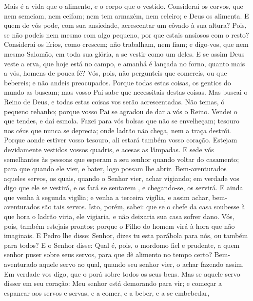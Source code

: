 {  Mais é a vida que o alimento, e
{} o corpo que o vestido.
  Considerai os corvos, que nem semeiam, nem ceifam; nem tem armazém, nem celeiro; e Deus os alimenta.
  E quem de vós pode, com sua ansiedade, acrescentar um côvado à sua altura?
  Pois, se não podeis nem mesmo com algo pequeno, por que estais ansiosos com o resto?
  Considerai os lírios, como crescem; não trabalham, nem fiam; e digo-vos, que nem mesmo Salomão, em toda sua glória,
{} a se vestir como um deles.
  E se assim Deus veste a erva, que hoje está no campo, e amanhá é lançada no forno, quanto mais
{} a vós, homens de pouca fé?
  Vós, pois, não pergunteis que comereis, ou que bebereis; e não andeis preocupados.
  Porque todas estas coisas, os gentios do mundo as buscam; mas vosso Pai sabe que necessitais destas coisas.
  Mas buscai o Reino de Deus, e todas estas coisas vos serão acrescentadas.
  Não temas, ó pequeno rebanho; porque vosso Pai se agradou de dar a vós o Reino.
  Vendei o que tendes, e daí esmola. Fazei para vós bolsas que não se envelheçam; tesouro nos céus que nunca se deprecia; onde ladrão não chega, nem a traça destrói.
  Porque aonde estiver vosso tesouro, ali estará também vosso coração.
  Estejam devidamente vestidos vossos quadris, e acesas as lâmpadas.
  E sede vós semelhantes às pessoas que esperam a seu senhor quando voltar do casamento; para que quando ele vier, e bater, logo possam lhe abrir.
  Bem-aventurados aqueles servos, os quais, quando o Senhor vier,
{} achar vigiando; em verdade vos digo que ele se vestirá, e os fará se sentarem
{}, e chegando-se, os servirá.
  E ainda que venha à segunda vigília; e
{} venha a terceira vigília, e assim
{} achar, bem-aventurados são tais servos.
  Isto, porém, sabei: que se o chefe da casa soubesse à que hora o ladrão viria, ele vigiaria, e não deixaria sua casa sofrer dano.
  Vós, pois, também estejais prontos; porque o Filho do homem virá à hora que não imaginais.
  E Pedro lhe disse: Senhor, dizes tu esta parábola para nós, ou também para todos?
  E o Senhor disse: Qual é, pois, o mordomo fiel e prudente, a quem
{} senhor puser sobre seus servos, para que
{} dê alimento no tempo certo?
  Bem-aventurado aquele servo ao qual, quando seu senhor vier, o achar fazendo assim.
  Em verdade vos digo, que o porá sobre todos os seus bens.
  Mas se aquele servo disser em seu coração: Meu senhor está demorando para vir; e começar a espancar aos servos e servas, e a comer, e a beber, e a se embebedar,
}
